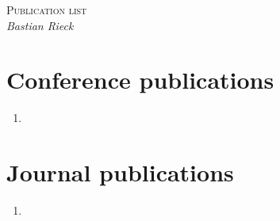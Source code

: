 \documentclass[letterpaper]{article}
\begin{document}
  \begin{flushleft}
    \parindent 0pt
    {\textsc{Publication list}}\\
    \emph{Bastian Rieck}\\[0.5cm]
  \end{flushleft}


  \nocite{*}
  \printbibliography[title = {All my publications}]


  \section*{Conference publications}

  \begin{enumerate}
    \item {}
  \end{enumerate}

  \section*{Journal publications}

  \begin{enumerate}[resume]
    \item {}
  \end{enumerate}
\end{document}
